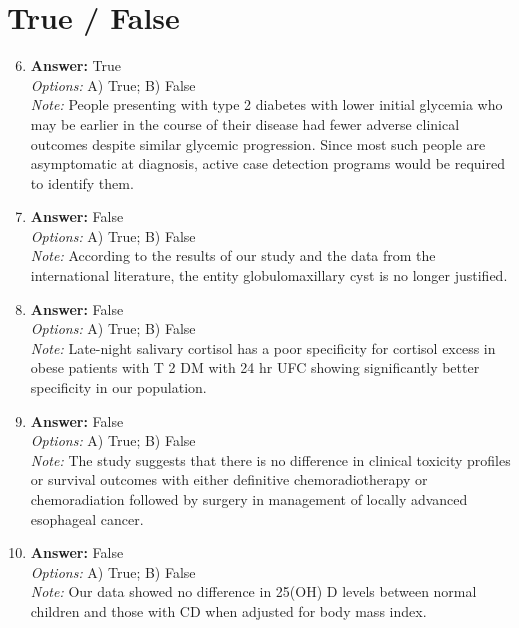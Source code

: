 \documentclass[12pt]{article}
\begin{document}
\section*{True / False}
\begin{enumerate}[label=\arabic*.]
\setcounter{enumi}{5}
\item \textbf{Answer:} True
\\ \textit{Options:} A) True; B) False
\\ \textit{Note:} People presenting with type 2 diabetes with lower initial glycemia who may be earlier in the course of their disease had fewer adverse clinical outcomes despite similar glycemic progression. Since most such people are asymptomatic at diagnosis, active case detection programs would be required to identify them.
\item \textbf{Answer:} False
\\ \textit{Options:} A) True; B) False
\\ \textit{Note:} According to the results of our study and the data from the international literature, the entity globulomaxillary cyst is no longer justified.
\item \textbf{Answer:} False
\\ \textit{Options:} A) True; B) False
\\ \textit{Note:} Late-night salivary cortisol has a poor specificity for cortisol excess in obese patients with T 2 DM with 24 hr UFC showing significantly better specificity in our population.
\item \textbf{Answer:} False
\\ \textit{Options:} A) True; B) False
\\ \textit{Note:} The study suggests that there is no difference in clinical toxicity profiles or survival outcomes with either definitive chemoradiotherapy or chemoradiation followed by surgery in management of locally advanced esophageal cancer.
\item \textbf{Answer:} False
\\ \textit{Options:} A) True; B) False
\\ \textit{Note:} Our data showed no difference in 25(OH) D levels between normal children and those with CD when adjusted for body mass index.
\end{enumerate}
\end{document}
